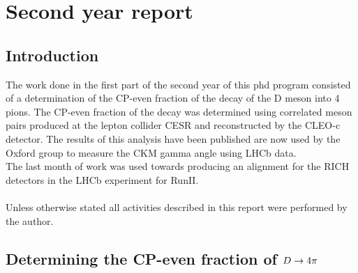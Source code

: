 \setcounter{chapter}{1}
\chapter*{Second year report}
\section{Introduction}
The work done in the first part of the second year of this phd program consisted of a determination of the CP-even fraction of the decay of the D meson into 4 pions. The CP-even fraction of the decay was determined using correlated \D meson pairs produced at the lepton collider CESR and reconstructed by the CLEO-c detector. The results of this analysis have been published are now used by the Oxford group to measure the CKM gamma angle using LHCb data. \\
The last month of work was used towards producing an alignment for the RICH detectors in the LHCb experiment for RunII.\\
\\
Unless otherwise stated all activities described in this report were performed by the author.\\

\section{Determining the CP-even fraction of $D \rightarrow 4\pi $}
